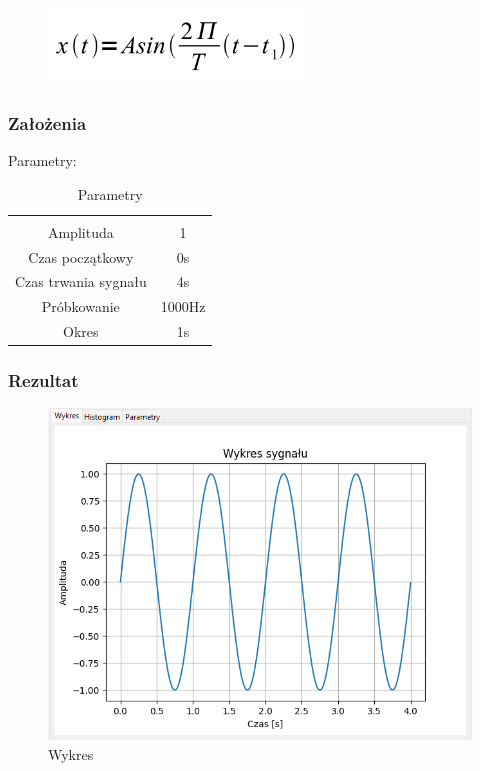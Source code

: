 \documentclass{article}
\begin{document}
\begin{figure}[!htbp]
    \centering
    \includegraphics[width=0.6\textwidth]{img/sinus.png}
\end{figure}
\subsubsection{Założenia}
\noindent
Parametry:
\begin{table}[h!]
    \centering
    \vspace{0.2cm}
    \begin{tabular}{|c|c|}
        \hline\hline\\[-0.4cm]
        Amplituda & 1  \\
        \hline
        Czas początkowy & 0s  \\
        \hline
        Czas trwania sygnału & 4s  \\
        \hline
        Próbkowanie & 1000Hz \\
        \hline
        Okres & 1s\\
        \hline
    \end{tabular}
    \caption{Parametry}
    \label{sinus}
\end{table}
\subsubsection{Rezultat}
\begin{figure}[h!]
    \centering
    \includegraphics[width=\textwidth]{img/sinus/wykres.png}
    \caption{Wykres}
\end{figure}
\end{document}
